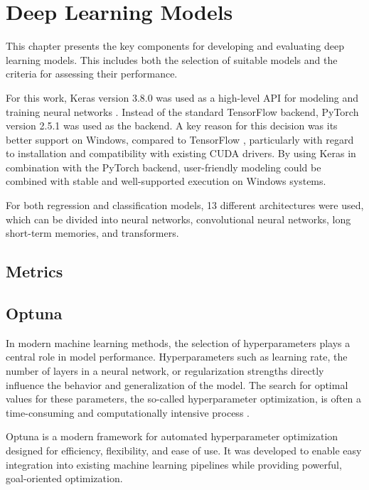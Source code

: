 \section{Deep Learning Models}

This chapter presents the key components for developing and evaluating deep learning models.
This includes both the selection of suitable models and the criteria for assessing their performance.

For this work, Keras version 3.8.0 was used as a high-level API for modeling and training neural networks \cite{keras-home}.
Instead of the standard TensorFlow backend, PyTorch version 2.5.1 was used as the backend.
A key reason for this decision was its better support on Windows, compared to TensorFlow \cite{tf-windows}, particularly with regard to installation and compatibility with existing CUDA drivers.
By using Keras in combination with the PyTorch backend, user-friendly modeling could be combined with stable and well-supported execution on Windows systems.


For both regression and classification models, 13 different architectures were used, which can be divided into neural networks, convolutional neural networks, long short-term memories, and transformers.

\subsection{Metrics}

\subsection{Optuna}

In modern machine learning methods, the selection of hyperparameters plays a central role in model performance.
Hyperparameters such as learning rate, the number of layers in a neural network, or regularization strengths directly influence the behavior and generalization of the model.
The search for optimal values for these parameters, the so-called hyperparameter optimization, is often a time-consuming and computationally intensive process \cite{hyperparameter-importance}.

Optuna is a modern framework for automated hyperparameter optimization designed for efficiency, flexibility, and ease of use.
It was developed to enable easy integration into existing machine learning pipelines while providing powerful, goal-oriented optimization.

